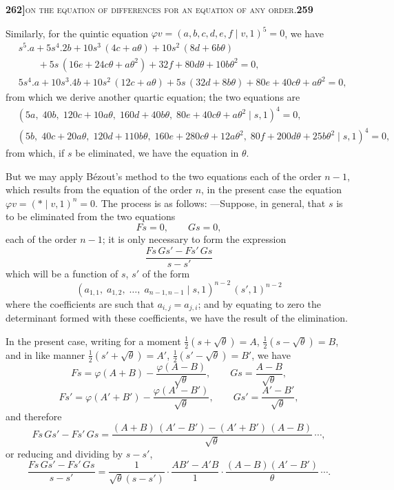 \documentclass[11pt]{article}
\newcommand{\Cdel}{\mid}
\begin{document}
\newpage
\setcounter{page}{259}

\noindent\textbf{262]}\hfill\textsc{on the equation of differences for an equation of any order.}\hfill\textbf{259}

\medskip

\noindent Similarly, for the quintic equation $\varphi v = (a, b, c, d, e, f \Cdel v, 1)^5 = 0$, we have
\[
\begin{aligned}
   & s^5 . a + 5 s^4 . 2 b + 10 s^3\,(4 c + a\theta) + 10 s^2\,(8 d + 6 b\theta)\\
   &\qquad{} + 5 s\,(16 e + 24 c\theta + a\theta^2) + 32 f + 80 d\theta + 10 b\theta^2 = 0,\\[3pt]
   & 5 s^4 . a + 10 s^3 . 4 b + 10 s^2\,(12 c + a\theta) + 5 s\,(32 d + 8 b\theta) + 80 e + 40 c\theta + a\theta^2 = 0,
\end{aligned}
\]
from which we derive another quartic equation; the two equations are
\[
\begin{aligned}
   & (5 a,\; 40 b,\; 120 c + 10 a\theta,\; 160 d + 40 b\theta,\; 80 e + 40 c\theta + a\theta^2 \Cdel s, 1)^4 = 0,\\
   & (5 b,\; 40 c + 20 a\theta,\; 120 d + 110 b\theta,\; 160 e + 280 c\theta + 12 a\theta^2,\; 80 f + 200 d\theta + 25 b\theta^2 \Cdel s, 1)^4 = 0,
\end{aligned}
\]
from which, if $s$ be eliminated, we have the equation in $\theta$.

\medskip

\noindent But we may apply B\'ezout's method to the two equations each of the order $n - 1$, which results from the equation of the order $n$, in the present case the equation $\varphi v = (\ast \Cdel v, 1)^n = 0$. The process is as follows: ---Suppose, in general, that $s$ is to be eliminated from the two equations
\[
   Fs = 0,\qquad Gs = 0,
\]
each of the order $n - 1$; it is only necessary to form the expression
\[
   \frac{F s\,G s' - F s'\,G s}{s - s'}
\]
which will be a function of $s$, $s'$ of the form
\[
   (a_{1,1},\; a_{1,2},\; \ldots,\; a_{n-1,n-1} \Cdel s, 1)^{n-2}\,(s', 1)^{n-2}
\]
where the coefficients are such that $a_{i,j} = a_{j,i}$; and by equating to zero the determinant formed with these coefficients, we have the result of the elimination.

\medskip

\noindent In the present case, writing for a moment $\tfrac{1}{2}(s + \sqrt{\theta}) = A$, $\tfrac{1}{2}(s - \sqrt{\theta}) = B$, and in like manner $\tfrac{1}{2}(s' + \sqrt{\theta}) = A'$, $\tfrac{1}{2}(s' - \sqrt{\theta}) = B'$, we have
\[
   Fs = \varphi(A + B) - \frac{\varphi(A - B)}{\sqrt{\theta}},\qquad Gs = \frac{A - B}{\sqrt{\theta}},
\]
\[
   Fs' = \varphi(A' + B') - \frac{\varphi(A' - B')}{\sqrt{\theta}},\qquad Gs' = \frac{A' - B'}{\sqrt{\theta}},
\]
and therefore
\[
   F s\,G s' - F s'\,G s = \frac{(A + B)\,(A' - B') - (A' + B')\,(A - B)}{\sqrt{\theta}}\,\cdots,
\]
or reducing and dividing by $s - s'$,
\[
   \frac{F s\,G s' - F s'\,G s}{s - s'} = \frac{1}{\sqrt{\theta}(s - s')}\cdot\frac{A B' - A' B}{1}\cdot\frac{(A - B)(A' - B')}{\theta}\,\cdots.
\]
\end{document}
